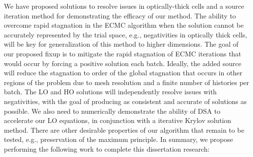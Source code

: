 \documentclass[11pt]{article}
\begin{document}
We have proposed solutions to resolve issues in optically-thick cells and a source
iteration method for demonstrating the efficacy of our method.  The ability to overcome rapid stagnation in the ECMC algorithm when the solution cannot
be accurately represented by the trial space, e.g., negativities in optically thick
cells,  will be key for generalization of this
method to higher dimensions.  The goal of our proposed fixup is to mitigate the rapid
stagnation of ECMC iterations that would occur by forcing a positive solution each
batch.  Ideally, the added source will reduce the stagnation to order of the global
stagnation that occurs in other regions of the problem due to mesh resolution and a
finite number of histories per batch.  The LO and HO solutions will independently resolve issues with
negativities, with the goal of producing as consistent and accurate of solutions as
possible.  We also need to numerically demonstrate the
ability of DSA to accelerate our LO equations, in conjunction with a iterative Krylov
solution method.  There are other
desirable properties of our algorithm that remain to be tested, e.g., preservation of
the maximum principle.  In summary, we propose performing the following work to
complete this dissertation research:
\end{document}
